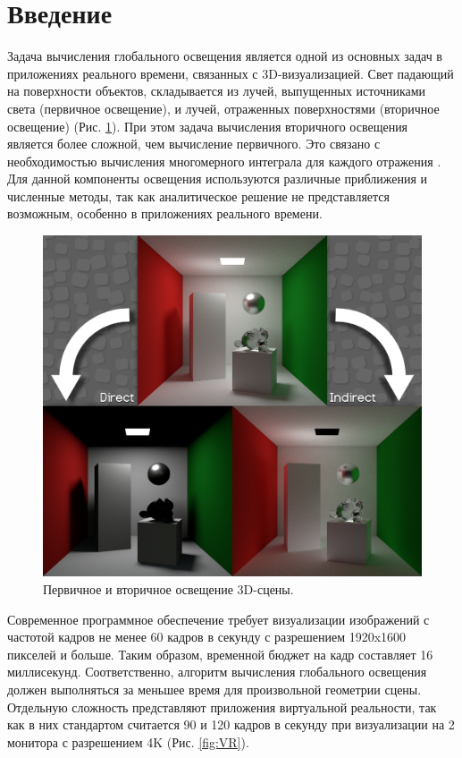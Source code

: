\documentclass[oneside,final,12pt, a4paper]{extreport}
\newcommand{\sect}[1]{%
  \newpage%
  \section*{#1}%
  \addcontentsline{toc}{section}{#1}}
\begin{document}
\sect{Введение}

Задача вычисления глобального освещения является одной из основных задач в приложениях реального времени, связанных с 3D-визуализацией. Свет падающий на поверхности объектов, складывается из лучей, выпущенных источниками света (первичное освещение), и лучей, отраженных поверхностями (вторичное освещение) (Рис. \ref{fig:Lighting}). При этом задача вычисления вторичного освещения является более сложной, чем вычисление первичного. Это связано с необходимостью вычисления многомерного интеграла для каждого отражения \cite{RT_rendering}. Для данной компоненты освещения используются различные приближения и численные методы, так как аналитическое решение не представляется возможным, особенно в приложениях реального времени.

\begin{figure}[htb]
  \begin{center}
  \includegraphics[width=\linewidth]{img/Lighting.png}
  \caption{Первичное и вторичное освещение 3D-сцены.}
  \label{fig:Lighting}
  \end{center}
\end{figure}

Современное программное обеспечение требует визуализации изображений с частотой кадров не менее 60 кадров в секунду с разрешением 1920x1600 пикселей и больше. Таким образом, временной бюджет на кадр составляет 16 миллисекунд. Соответственно, алгоритм вычисления глобального освещения должен выполняться за меньшее время для произвольной геометрии сцены. Отдельную сложность представляют приложения виртуальной реальности, так как в них стандартом считается 90 и 120 кадров в секунду при визуализации на 2 монитора с разрешением 4K (Рис. \ref{fig:VR}).
\end{document}
